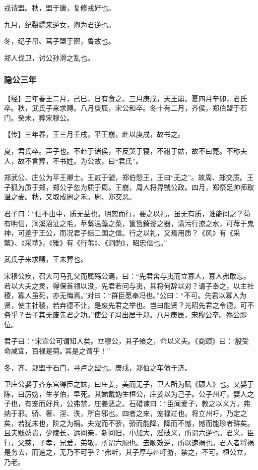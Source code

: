 \documentclass[]{article}
\begin{document}
戎请盟。秋，盟于唐，复修戎好也。

九月，纪裂繻来逆女，卿为君逆也。

冬，纪子帛、莒子盟于密，鲁故也。

郑人伐卫，讨公孙滑之乱也。

\hypertarget{header-n40}{%
\subsubsection{隐公三年}\label{header-n40}}

【经】三年春王二月，己巳，日有食之。三月庚戌，天王崩。夏四月辛卯，君氏卒。秋，武氏子来求赙。八月庚辰，宋公和卒。冬十有二月，齐侯，郑伯盟于石门。癸未，葬宋穆公。

【传】三年春，王三月壬戌，平王崩，赴以庚戌，故书之。

夏，君氏卒。声子也。不赴于诸侯，不反哭于寝，不祔于姑，故不曰薨。不称夫人，故不言葬，不书姓。为公故，曰``君氏''。

郑武公、庄公为平王卿士。王贰于虢，郑伯怨王，王曰``无之''。故周、郑交质。王子狐为质于郑，郑公子忽为质于周。王崩，周人将畀虢公政。四月，郑祭足帅师取温之麦。秋，又取成周之禾。周、郑交恶。

君子曰：``信不由中，质无益也。明恕而行，要之以礼，虽无有质，谁能间之？苟有明信，涧溪沼沚之毛，苹蘩温藻之菜，筐筥錡釜之器，潢污行潦之水，可荐于鬼神，可羞于王公，而况君子结二国之信。行之以礼，又焉用质？《风》有《采繁》、《采苹》，《雅》有《行苇》、《泂酌》，昭忠信也。''

武氏子来求赙，王未葬也。

宋穆公疾，召大司马孔父而属殇公焉，曰：``先君舍与夷而立寡人，寡人弗敢忘。若以大夫之灵，得保首领以没，先君若问与夷，其将何辞以对？请子奉之，以主社稷，寡人虽死，亦无悔焉。''对曰：``群臣愿奉冯也。''公曰：``不可。先君以寡人为贤，使主社稷，若弃德不让，是废先君之举也。岂曰能贤？光昭先君之令德，可不务乎？吾子其无废先君之功。''使公子冯出居于郑。八月庚辰，宋穆公卒。殇公即位。

君子曰：``宋宣公可谓知人矣。立穆公，其子飨之，命以义夫。《商颂》曰：`殷受命咸宜，百禄是荷。'其是之谓乎！''

冬，齐、郑盟于石门，寻卢之盟也。庚戌，郑伯之车偾于济。

卫庄公娶于齐东宫得臣之妹，曰庄姜，美而无子，卫人所为赋《硕人》也。又娶于陈，曰厉妫，生孝伯，早死。其娣戴妫生桓公，庄姜以为己子。公子州吁，嬖人之子也，有宠而好兵，公弗禁，庄姜恶之。石碏谏曰：``臣闻爱子，教之以义方，弗纳于邪。骄、奢、淫、泆，所自邪也。四者之来，宠禄过也。将立州吁，乃定之矣，若犹未也，阶之为祸。夫宠而不骄，骄而能降，降而不憾，憾而能珍者鲜矣。且夫贱妨贵，少陵长，远间亲，新间旧，小加大，淫破义，所谓六逆也。君义，臣行，父慈，子孝，兄爱，弟敬，所谓六顺也。去顺效逆，所以速祸也。君人者将祸是务去，而速之，无乃不可乎？''弗听，其子厚与州吁游，禁之，不可。桓公立，乃老。
\end{document}
